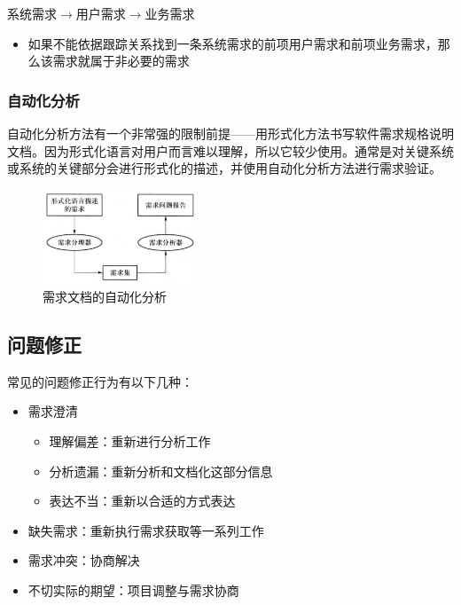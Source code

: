 系统需求$\rightarrow$用户需求$\rightarrow$业务需求
\begin{itemize}
    \item 如果不能依据跟踪关系找到一条系统需求的前项用户需求和前项业务需求，那么该需求就属于非必要的需求
\end{itemize}


\subsubsection{自动化分析}
自动化分析方法有一个非常强的限制前提——用形式化方法书写软件需求规格说明文档。因为形式化语言对用户而言难以理解，所以它较少使用。通常是对关键系统或系统的关键部分会进行形式化的描述，并使用自动化分析方法进行需求验证。

\begin{figure}[H]
    \centering
    \vspace{-0.2em}
	\includegraphics[width=0.41\textwidth]{img/需求文档的自动化分析.png}
    \caption*{需求文档的自动化分析}
    \vspace{-1em}
\end{figure}


\subsection{问题修正}
常见的问题修正行为有以下几种：
\vspace{-0.8em}
\begin{multicols}{2}
    \begin{itemize}
        \item 需求澄清
        \begin{itemize}
            \item 理解偏差：重新进行分析工作
            \item 分析遗漏：重新分析和文档化这部分信息
            \item 表达不当：重新以合适的方式表达
        \end{itemize}
        \item 缺失需求：重新执行需求获取等一系列工作
        \item 需求冲突：协商解决
        \item 不切实际的期望：项目调整与需求协商
    \end{itemize}
\end{multicols}
\vspace{-1em}


